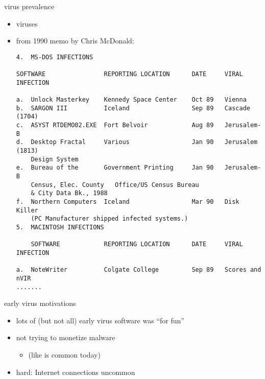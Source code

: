 \begin{frame}[fragile,label=commercial]{virus prevalence}
    \begin{itemize}
        \item viruses 
        \item from 1990 memo by Chris McDonald:
\begin{Verbatim}[fontsize=\fontsize{8}{9}\selectfont]
4.  MS-DOS INFECTIONS

SOFTWARE                REPORTING LOCATION      DATE     VIRAL INFECTION

a.  Unlock Masterkey    Kennedy Space Center    Oct 89   Vienna
b.  SARGON III          Iceland                 Sep 89   Cascade (1704)
c.  ASYST RTDEMO02.EXE  Fort Belvoir            Aug 89   Jerusalem-B
d.  Desktop Fractal     Various                 Jan 90   Jerusalem (1813)
	Design System
e.  Bureau of the       Government Printing     Jan 90   Jerusalem-B
    Census, Elec. County   Office/US Census Bureau
    & City Data Bk., 1988
f.  Northern Computers  Iceland                 Mar 90   Disk Killer
    (PC Manufacturer shipped infected systems.)
5.  MACINTOSH INFECTIONS

    SOFTWARE            REPORTING LOCATION      DATE     VIRAL INFECTION

a.  NoteWriter          Colgate College         Sep 89   Scores and nVIR
.......
\end{Verbatim}
    \end{itemize}
\end{frame}

\begin{frame}{early virus motivations}
    \begin{itemize}
        \item lots of (but not all) early virus software was ``for fun''
        \item not trying to monetize malware
            \begin{itemize}
            \item (like is common today)
            \end{itemize}
        \item hard: Internet connections uncommon
    \end{itemize}
\end{frame}


